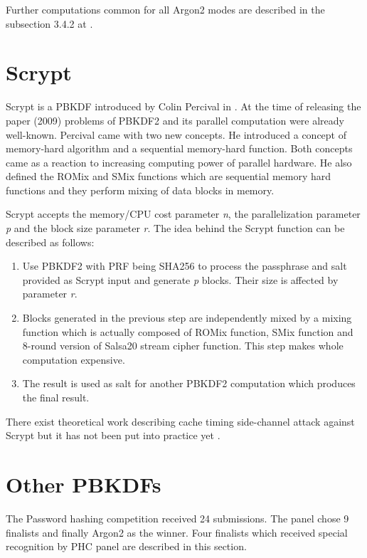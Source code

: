 \documentclass[nolof]{fithesis3}
\begin{document}
Further computations common for all Argon2 modes are described in the subsection 3.4.2 at \parencite{argon2draft}.

\section{Scrypt}
\label{sec:scrypt}
Scrypt is a PBKDF introduced by Colin Percival in \parencite{memoryhard}. At the time of releasing the paper (2009) problems of PBKDF2 and its parallel computation were already well-known. Percival came with two new concepts. He introduced a concept of memory-hard algorithm and a sequential memory-hard function. Both concepts came as a reaction to increasing computing power of parallel hardware. He also defined the ROMix and SMix functions which are sequential memory hard functions and they perform mixing of data blocks in memory.

Scrypt accepts the memory/CPU cost parameter \emph{n}, the parallelization parameter \emph{p} and the block size parameter \emph{r}. The idea behind the Scrypt function can be described as follows:

\begin{enumerate}
\item Use PBKDF2 with PRF being SHA256 to process the passphrase and salt provided as Scrypt input and generate \emph{p} blocks. Their size is affected by parameter \emph{r}.

\item Blocks generated in the previous step are independently mixed by a mixing function which is actually composed of ROMix function, SMix function and 8-round version of Salsa20 stream cipher function. This step makes whole computation expensive.

\item The result is used as salt for another PBKDF2 computation which produces the final result.
\end{enumerate}

There exist theoretical work describing cache timing side-channel attack against Scrypt but it has not been put into practice yet \parencite{scryptattack}.

\section{Other PBKDFs}
The Password hashing competition received 24 submissions. The panel chose 9 finalists and finally Argon2 as the winner. Four finalists which received special recognition by PHC panel are described in this section.
\end{document}
